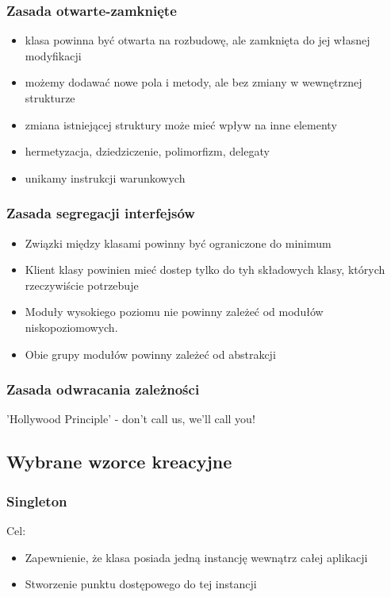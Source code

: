 \documentclass[a4paper]{article}
\begin{document}
\subsubsection{Zasada otwarte-zamknięte}
    \begin{itemize}
        \item klasa powinna być otwarta na rozbudowę, ale zamknięta do jej własnej modyfikacji
        \item możemy dodawać nowe pola i metody, ale bez zmiany w wewnętrznej strukturze
        \item zmiana istniejącej struktury może mieć wpływ na inne elementy
        \item hermetyzacja, dziedziczenie, polimorfizm, delegaty
        \item unikamy instrukcji warunkowych
    \end{itemize}

\subsubsection{Zasada segregacji interfejsów}
\begin{itemize}
    \item Związki między klasami powinny być ograniczone do minimum
    \item Klient klasy powinien mieć dostep tylko do tyh składowych klasy,
    których rzeczywiście potrzebuje
    \item Moduły wysokiego poziomu nie powinny
    zależeć od modułów niskopoziomowych.
    \item Obie grupy modułów powinny zależeć od
    abstrakcji
\end{itemize}

\subsubsection{Zasada odwracania zależności}
'Hollywood Principle' - don't call us, we'll call you!

\subsection{Wybrane wzorce kreacyjne}

    \subsubsection{Singleton}
Cel:
    \begin{itemize}
        \item Zapewnienie, że klasa posiada jedną instancję wewnątrz całej aplikacji
        \item Stworzenie punktu dostępowego do tej instancji
    \end{itemize}
\end{document}
